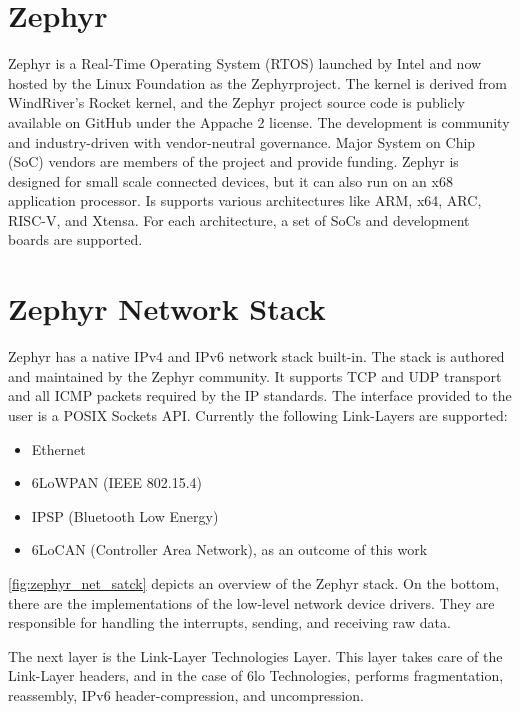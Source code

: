 \FloatBarrier

\section{Zephyr}
\label{sec:zephyr}
Zephyr is a Real-Time Operating System (RTOS) launched by Intel and now hosted by the Linux Foundation as the Zephyrproject.
The kernel is derived from WindRiver's Rocket kernel, and the Zephyr project source code is publicly available on GitHub under the Appache 2 license.
The development is community and industry-driven with vendor-neutral governance.
Major System on Chip (SoC) vendors are members of the project and provide funding.
Zephyr is designed for small scale connected devices, but it can also run on an x68 application processor.
Is supports various architectures like ARM, x64, ARC, RISC-V, and Xtensa.
For each architecture, a set of SoCs and development boards are supported.

\FloatBarrier

\section{Zephyr Network Stack}
\label{sec:network_stack}
Zephyr has a native IPv4 and IPv6 network stack built-in. The stack is authored and maintained by the Zephyr community.
It supports TCP and UDP transport and all ICMP packets required by the IP standards.
The interface provided to the user is a POSIX Sockets API.
Currently the following Link-Layers are supported:

\begin{itemize}
	\item Ethernet
	\item 6LoWPAN (IEEE 802.15.4)
	\item IPSP (Bluetooth Low Energy)
	\item 6LoCAN (Controller Area Network), as an outcome of this work
\end{itemize}



\autoref{fig:zephyr_net_satck} depicts an overview of the Zephyr stack.
On the bottom, there are the implementations of the low-level network device drivers.
They are responsible for handling the interrupts, sending, and receiving raw data.

The next layer is the Link-Layer Technologies Layer.
This layer takes care of the Link-Layer headers, and in the case of 6lo Technologies, performs fragmentation, reassembly, IPv6 header-compression, and uncompression.

